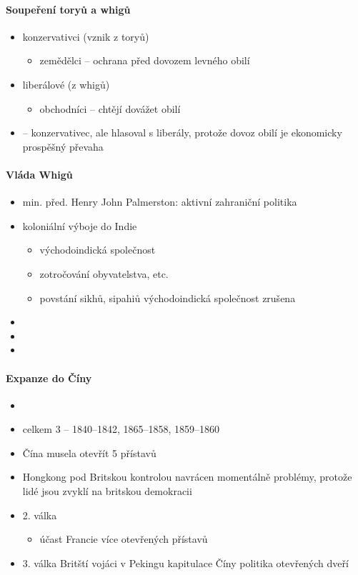 \paragraph{Soupeření toryů a whigů}
\begin{itemize}
\item konzervativci (vznik z toryů)
	\begin{itemize}
	\item zemědělci -- ochrana před dovozem levného obilí
	\end{itemize}
\item liberálové (z whigů)
	\begin{itemize}
	\item obchodníci -- chtějí dovážet obilí 
	\end{itemize}
\item {} -- konzervativec, ale hlasoval s liberály, protože dovoz obilí je ekonomicky prospěšný \ra převaha
\end{itemize}

\paragraph{Vláda Whigů}
\begin{itemize}
\item min. před. Henry John Palmerston: aktivní zahraniční politika
\item koloniální výboje do Indie
	\begin{itemize}
	\item východoindická společnost
	\item zotročování obyvatelstva, etc.
	\item povstání sikhů, sipahiů \ra východoindická společnost zrušena
	\end{itemize}
\item 
\item
\item
\end{itemize}


\paragraph{Expanze do Číny}
\begin{itemize}
\item {}
\item celkem 3 -- 1840--1842, 1865--1858, 1859--1860
\item Čína musela otevřít 5 přístavů 
\item Hongkong pod Britskou kontrolou \ra navrácen \ra momentálně problémy, protože lidé jsou zvyklí na britskou demokracii
\item 2. válka
	\begin{itemize}
	\item účast Francie \ra více otevřených přístavů
	\end{itemize}
\item 3. válka \ra Britští vojáci v Pekingu \ra kapitulace Číny \ra politika otevřených dveří
\end{itemize}

